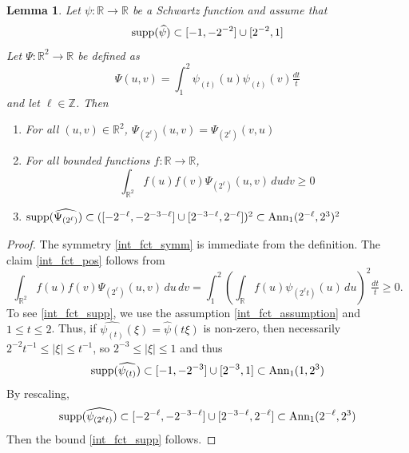 \documentclass[12pt,reqno]{amsart}
\theoremstyle{plain}
\newtheorem{lemma}[theorem]{Lemma}
\numberwithin{equation}{section}
\theoremstyle{remark}
\newcommand{\uses}[1]{}
\newcommand{\usesdefs}[1]{}
\newcommand{\Z}{{\mathbb Z}}
\newcommand{\R}{{\mathbb R}}
\begin{document}
   \begin{lemma}
         \label{lem:int_fct}\uses{}\usesdefs{}
          Let $\psi:\R\to \R$ be a Schwartz function and assume that
          \begin{equation}
              \label{int_fct_assumption}
              \textup{supp}(\widehat{\psi})
\subset  [-1,-2^{-2}]\cup [2^{-2},1]
          \end{equation}
     Let $\Psi:\R^2\to \R$ be defined as
     \begin{equation}\label{auto:integrated-tensor-kernel}\Psi(u,v) = \int_1^2 \psi_{(t)}(u) \psi_{(t)}(v) \tfrac{dt}{t}\end{equation}
     and let $\ell\in\Z$.
   Then
        \begin{enumerate}
    \item  \label{int_fct_symm} For all $(u,v)\in \R^2$,  $\Psi_{(2^\ell)}(u,v) = \Psi_{(2^\ell)}(v,u)$
     \item \label{int_fct_pos}  For all bounded functions $f:\R\to\R$,
     \begin{equation}\label{auto:integrated-tensor-positivity}
         \int_{\R^2} f(u){f(v)} \Psi_{(2^\ell)}(u,v)\,dudv
         \ge 0
     \end{equation}
     \item  \label{int_fct_supp}
     $         \textup{supp}(\widehat{\Psi_{(2^\ell)}})
\subset  ([-2^{-\ell},-2^{-3-\ell}]\cup [2^{-3-\ell},2^{-\ell}])^2 \subset \textup{Ann}_1(2^{-\ell},2^3)^2$
     \end{enumerate}
     \end{lemma}
          \begin{proof}
The symmetry \eqref{int_fct_symm}
 is immediate from the definition.
 The claim \eqref{int_fct_pos} follows from
          \[
\int_{\R^2}f(u)f(v)\Psi_{(2^\ell)}(u,v)\,du\,dv
=
\int_1^2\left(\int_\R f(u)\psi_{(2^\ell t)}(u)\,du\right)^2\tfrac{dt}{t}
\ge0.
\]
To see \eqref{int_fct_supp}, we use the assumption \eqref{int_fct_assumption} and $1\le t \le 2$. Thus, if  $\widehat{\psi_{(t)}}(\xi) = \widehat{\psi}(t\xi)$ is non-zero, then necessarily $2^{-2}t^{-1}\le |\xi|\le t^{-1} $, so $2^{-3}\le |\xi| \le 1 $ and thus
\[         \textup{supp}(\widehat{\psi_{(t)}})
\subset  [-1,-2^{-3}]\cup [2^{-3},1] \subset \textup{Ann}_1(1,2^3) \]
By rescaling,
\[         \textup{supp}(\widehat{\psi_{(2^\ell t)}})
\subset  [-2^{-\ell},-2^{-3-\ell}]\cup [2^{-3-\ell},2^{-\ell}] \subset \textup{Ann}_1(2^{-\ell},2^3) \]
Then the bound \eqref{int_fct_supp}
  follows.
     \end{proof}
\end{document}
